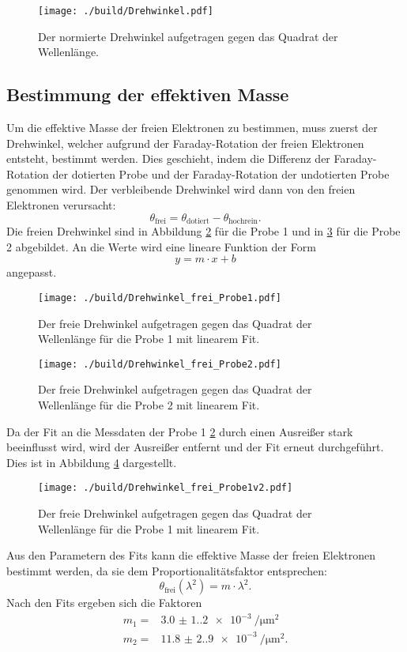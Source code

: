 \begin{figure}[H]
  \centering
  \texttt{[image: ./build/Drehwinkel.pdf]}
  \caption{Der normierte Drehwinkel aufgetragen gegen das Quadrat der Wellenlänge.}
  \label{fig:drehwinkel}
\end{figure}

\subsection{Bestimmung der effektiven Masse}
\label{subsec:effektiveMasse}
Um die effektive Masse der freien Elektronen zu bestimmen, muss zuerst der Drehwinkel,
welcher aufgrund der Faraday-Rotation der freien Elektronen entsteht, bestimmt werden.
Dies geschieht, indem die Differenz der Faraday-Rotation der dotierten Probe und der
Faraday-Rotation der undotierten Probe genommen wird. Der verbleibende Drehwinkel
wird dann von den freien Elektronen verursacht:
\begin{equation}
  \theta_{\text{frei}} = \theta_{\text{dotiert}} - \theta_{\text{hochrein}}.
  \label{eqn:berechnungfrei}
\end{equation}
Die freien Drehwinkel sind in Abbildung \ref{fig:frei1} für die Probe 1 und in
\ref{fig:frei2} für die Probe 2 abgebildet. An die Werte wird eine lineare
Funktion der Form
\begin{equation}
  y = m \cdot x + b
  \label{eqn:linearerfit}
\end{equation}
angepasst.
\begin{figure}[H]
  \centering
  \texttt{[image: ./build/Drehwinkel\_frei\_Probe1.pdf]}
  \caption{Der freie Drehwinkel aufgetragen gegen das Quadrat der Wellenlänge für die Probe 1 mit linearem Fit.}
  \label{fig:frei1}
\end{figure}
\noindent
\begin{figure}[H]
  \centering
  \texttt{[image: ./build/Drehwinkel\_frei\_Probe2.pdf]}
  \caption{Der freie Drehwinkel aufgetragen gegen das Quadrat der Wellenlänge für die Probe 2 mit linearem Fit.}
  \label{fig:frei2}
\end{figure}
\noindent
Da der Fit an die Messdaten der Probe 1 \ref{fig:frei1} durch einen Ausreißer
stark beeinflusst wird, wird der Ausreißer entfernt und der Fit erneut durchgeführt.
Dies ist in Abbildung \ref{fig:frei1v2} dargestellt.
\begin{figure}[H]
  \centering
  \texttt{[image: ./build/Drehwinkel\_frei\_Probe1v2.pdf]}
  \caption{Der freie Drehwinkel aufgetragen gegen das Quadrat der Wellenlänge für die Probe 1 mit linearem Fit.}
  \label{fig:frei1v2}
\end{figure}
\noindent
Aus den Parametern des Fits kann die effektive Masse der freien Elektronen bestimmt werden,
da sie dem Proportionalitätsfaktor entsprechen:
\begin{equation*}
  \theta_{\text{frei}} (\lambda^{2}) = m \cdot \lambda^{2}.
\end{equation*}
Nach den Fits ergeben sich die Faktoren
\begin{align}
  m_{1} = & \SI{3.0(1.2)e-3}{\per\micro\meter\squared} \\
  m_{2} = & \SI{11.8(2.9)e-3}{\per\micro\meter\squared}.
\end{align}
